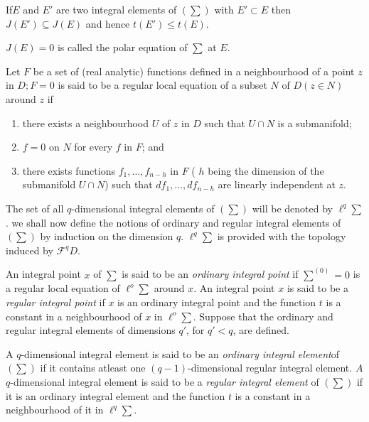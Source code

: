 \begin{proposition}\label{chap2:sec2.2:prop4}%
  If\pageoriginale $E$ and $E'$ are two integral elements of $(\sum)$ with $E'
  \subset E$ then $J(E') \subseteq J(E)$ and hence $t(E') \le t(E)$. 
\end{proposition}

\begin{defi*}%
  $J(E) = 0$ is called the polar equation of $\sum$ at $E$.
\end{defi*}

\begin{defi*}%
  Let $F$ be a set of (real analytic) functions defined in a
  neighbourhood of a point $z$ in $D; F = 0$ is said to be a regular
  local equation of a subset $N$ of $D (z\in N)$ around $z$ if  
  \begin{enumerate}[\rm (i)]
  \item there exists a neighbourhood $U$ of $z$ in $D$ such that $U
    \cap N$ is a submanifold; 
  \item $f = 0$ on $N$ for every $f$ in  $F$;  and 
  \item there exists functions $f_1,  \ldots,  f_{n-h}$ in $F$ ( $h$
    being the dimension of the submanifold $U \cap N$) such that
    $df_1,  \ldots,  df_{n-h}$ are linearly independent at $z$. 
  \end{enumerate}
\end{defi*}

The set  of all $q$-dimensional integral elements of $(\sum)$ will be
denoted by $\ell^q \sum$. we shall now define the notions of ordinary and
regular integral elements  of $(\sum)$ by induction on the dimension
$q$. $\ell^q \sum$ is provided with the topology induced by
$\mathscr{F}^q D$. 

\begin{defi*}%
  An integral point $x$ of $\sum$ is said to be an {\em{ordinary
      integral point}} if $\sum^{(0)} = 0$ is a regular local equation
  of $\ell^o \sum$ around $x$. An integral point $x$ is said to be a
  {\em{regular integral point}} if $x$ is an ordinary integral point
  and the function $t$ is a constant in a neighbourhood of $x$ in
  $\ell^o \sum$. Suppose that the ordinary and regular integral
  elements of dimensions $q'$,  for $q' < q$,  are defined. 
\end{defi*}

\begin{defi*} %
  A $q$-dimensional integral element is said to be an  \textit{
    ordinary integral element}\pageoriginale of $(\sum)$ if it contains atleast one
  $(q-1)$-dimensional regular integral element. $A$ $q$-dimensional
  integral element is said to be a \textit{regular integral element}
  of $(\sum)$ if it is an ordinary integral element and the function
  $t$ is a constant in a  neighbourhood of it in $\ell^q \sum$. 
\end{defi*}

